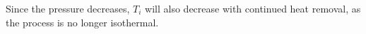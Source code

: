 Since the pressure decreases, \( T_i \) will also decrease with continued heat removal, as the process is no longer isothermal.